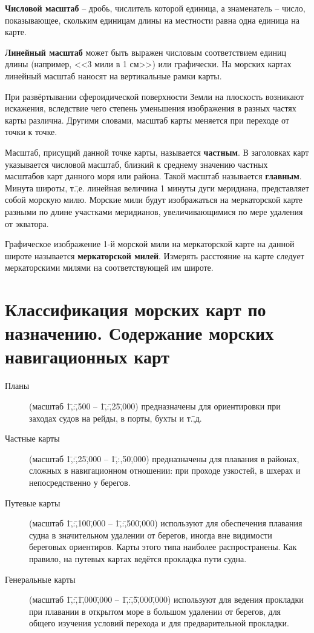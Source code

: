 \textbf{Числовой масштаб} \--- дробь, числитель которой единица, а знаменатель \--- число, показывающее, скольким единицам длины на местности равна одна единица на карте. 

\textbf{Линейный масштаб} может быть выражен числовым соответствием единиц длины (например, <<3 мили в 1 см>>) или графически. На морских картах линейный масштаб наносят на вертикальные рамки карты. 

При развёртывании сфероидической поверхности Земли на плоскость возникают искажения, вследствие чего степень уменьшения изображения в разных частях карты различна. Другими словами, масштаб карты меняется при переходе от точки к точке. 

Масштаб, присущий данной точке карты, называется \textbf{частным}. В
заголовках карт указывается числовой масштаб, близкий к среднему
значению частных масштабов карт данного моря или района. Такой масштаб
называется \textbf{главным}. Минута широты, т.\=,е. линейная величина
1 минуты дуги меридиана, представляет собой морскую милю. Морские мили
будут изображаться на меркаторской карте разными по длине участками
меридианов, увеличивающимися по мере удаления от экватора.

Графическое изображение 1-й морской мили на меркаторской карте на
данной широте называется \textbf{меркаторской
  милей}. Измерять расстояние на карте
следует меркаторскими милями на соответствующей им широте.

\section{Классификация морских карт по назначению. Содержание морских навигационных карт}

\begin{description} 
\item [Планы] (масштаб 1\=,:\=,500 \--- 1\=,:\=,25\=,000)
  предназначены для ориентировки при заходах судов на рейды, в порты,
  бухты и т.\=,д.
\item [Частные карты] (масштаб 1\=,:\=,25\=,000
  \--- 1\=,:\-,50\=,000) предназначены для плавания в районах, сложных
  в навигационном отношении: при проходе узкостей, в шхерах и
  непосредственно у берегов.
\item [Путевые карты] (масштаб 1\=,:\=,100\=,000
  \--- 1\=,:\=,500\=,000) используют для обеспечения плавания судна в
  значительном удалении от берегов, иногда вне видимости береговых
  ориентиров. Карты этого типа наиболее распространены. Как правило,
  на путевых картах ведётся прокладка пути судна.
\item [Генеральные карты] (масштаб
  1\=,:\=,1\=,000\=,000 \--- 1\=,:\=,5\=,000\=,000) используют для
  ведения прокладки при плавании в открытом море в большом удалении от
  берегов, для общего изучения условий перехода и для предварительной
  прокладки.
\end{description}

